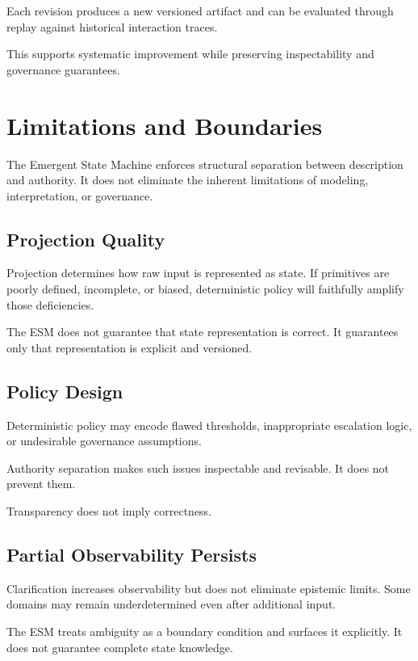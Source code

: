 \documentclass[11pt]{article}
\begin{document}
Each revision produces a new versioned artifact and can be evaluated through replay against historical interaction traces.

This supports systematic improvement while preserving inspectability and governance guarantees.

\section{Limitations and Boundaries}

The Emergent State Machine enforces structural separation between description and authority. It does not eliminate the inherent limitations of modeling, interpretation, or governance.

\subsection{Projection Quality}

Projection determines how raw input is represented as state. If primitives are poorly defined, incomplete, or biased, deterministic policy will faithfully amplify those deficiencies.

The ESM does not guarantee that state representation is correct. It guarantees only that representation is explicit and versioned.

\subsection{Policy Design}

Deterministic policy may encode flawed thresholds, inappropriate escalation logic, or undesirable governance assumptions.

Authority separation makes such issues inspectable and revisable. It does not prevent them.

Transparency does not imply correctness.

\subsection{Partial Observability Persists}

Clarification increases observability but does not eliminate epistemic limits. Some domains may remain underdetermined even after additional input.

The ESM treats ambiguity as a boundary condition and surfaces it explicitly. It does not guarantee complete state knowledge.
\end{document}
